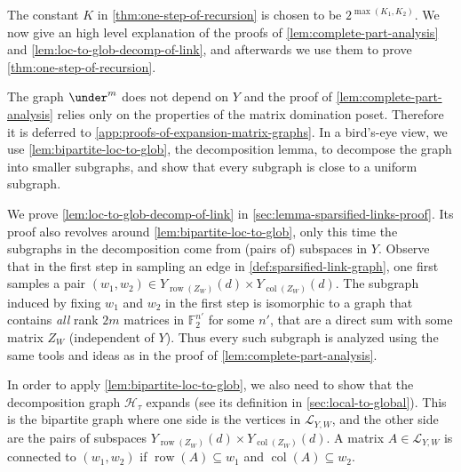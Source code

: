 \documentclass[10pt,a4paper]{article}
\newcommand{\prettyref}[1]{\cref{#1}}
\theoremstyle{definition}
\theoremstyle{remark}
\newcommand{\F}{\mathbb{F}}
\DeclareMathOperator{\row}{row}
\DeclareMathOperator{\col}{col}
\numberwithin{equation}{section}
\let\pref=\prettyref
\def\Y{Y}
\def\SL{\mathcal{L}}
\def\B{\mathcal{H}}
\def\diml{d}
\def\dimlin{{\diml}}
\begin{document}
The constant \(K\) in \pref{thm:one-step-of-recursion} is chosen to be \(2^{\max(K_1,K_2)}\). We now give an high level explanation of the proofs of \pref{lem:complete-part-analysis} and \pref{lem:loc-to-glob-decomp-of-link}, and afterwards we use them to prove \pref{thm:one-step-of-recursion}.

The graph \(\under^m\) does not depend on \(Y\) and the proof of \pref{lem:complete-part-analysis} relies only on the properties of the matrix domination poset. Therefore it is deferred to \pref{app:proofs-of-expansion-matrix-graphs}. In a bird's-eye view, we use \pref{lem:bipartite-loc-to-glob}, the decomposition lemma, to decompose the graph into smaller subgraphs, and show that every subgraph is close to a uniform subgraph. %

We prove \pref{lem:loc-to-glob-decomp-of-link} in \pref{sec:lemma-sparsified-links-proof}. Its proof also revolves around \pref{lem:bipartite-loc-to-glob}, only this time the subgraphs in the decomposition come from (pairs of) subspaces in \(Y\). Observe that in the first step in sampling an edge in \pref{def:sparsified-link-graph}, one first samples a pair \((w_1,w_2) \in \Y_{\row(Z_W)}(\dimlin)\times \Y_{\col(Z_W)}(\dimlin)\). The subgraph induced by fixing \(w_1\) and \(w_2\) in the first step is isomorphic to a graph that contains \emph{all} rank \(2m\) matrices in \(\F_2^{n'}\) for some \(n'\), that are a direct sum with some matrix \(Z_W\) (independent of \(\Y\)). Thus every such subgraph is analyzed using the same tools and ideas as in the proof of \pref{lem:complete-part-analysis}. 

In order to apply \pref{lem:bipartite-loc-to-glob}, we also need to show that the decomposition graph \(\B_\tau\) expands (see its definition in \pref{sec:local-to-global}). This is the bipartite graph where one side is the vertices in \(\SL_{\Y,W}\), and the other side are the pairs of subspaces \(\Y_{\row(Z_W)}(\dimlin)\times \Y_{\col(Z_W)}(\dimlin)\). A matrix \(A \in \SL_{\Y,W}\) is connected to \((w_1,w_2)\) if \(\row(A) \subseteq w_1\) and \(\col(A) \subseteq w_2\).
\end{document}
